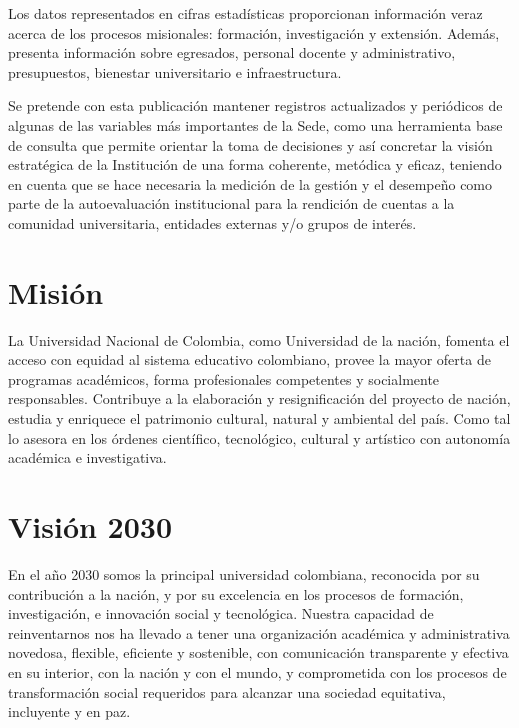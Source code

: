\documentclass[
]{book}
\begin{document}
Los datos representados en cifras estadísticas proporcionan información veraz acerca de los procesos misionales: formación, investigación y extensión. Además, presenta información sobre egresados, personal docente y administrativo, presupuestos, bienestar universitario e infraestructura.

Se pretende con esta publicación mantener registros actualizados y periódicos de algunas de las variables más importantes de la Sede, como una herramienta base de consulta que permite orientar la toma de decisiones y así concretar la
visión estratégica de la Institución de una forma coherente, metódica y eficaz, teniendo en cuenta que se hace necesaria la medición de la gestión y el desempeño como parte de la autoevaluación institucional para la rendición de cuentas a la comunidad universitaria, entidades externas y/o grupos de interés.

\hypertarget{mision}{%
\section*{Misión}\label{mision}}

La Universidad Nacional de Colombia, como Universidad de la nación, fomenta el acceso con equidad al sistema educativo colombiano, provee la mayor oferta de programas académicos, forma profesionales competentes y socialmente responsables. Contribuye a la elaboración y resignificación del proyecto de nación, estudia y enriquece el patrimonio cultural, natural y ambiental del país. Como tal lo asesora en los órdenes científico, tecnológico, cultural y artístico con autonomía académica e investigativa.

\hypertarget{vision}{%
\section*{Visión 2030}\label{vision}}

En el año 2030 somos la principal universidad colombiana, reconocida por su contribución a la
nación, y por su excelencia en los procesos de formación, investigación, e innovación social y
tecnológica. Nuestra capacidad de reinventarnos nos ha llevado a tener una organización académica y administrativa novedosa, flexible, eficiente y sostenible, con comunicación transparente y efectiva en su interior, con la nación y con el mundo, y comprometida con los procesos
de transformación social requeridos para alcanzar una sociedad equitativa, incluyente y en paz.
\end{document}
